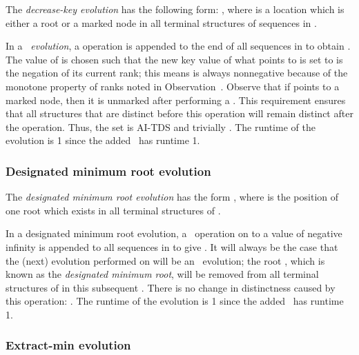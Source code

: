 The \emph{decrease-key evolution} has the following form: , where  is a location which is either a root or a marked node in all terminal structures of sequences in . 
\begin{fullonly}

\end{fullonly}
In a \emph{\opDc\ evolution}, a \opDc operation is appended to the end of all sequences in   to obtain . 
The value of  is chosen such that the new key value of what  points to is set to is the negation of its current rank; this means  is always nonnegative because of the monotone property of ranks noted in Observation~. 
Observe that if  points to a marked node, then it is unmarked after performing a \eDc. This requirement ensures that all structures that are distinct before this operation will remain distinct after the operation. Thus, the set  is AI-TDS and trivially . The runtime of the evolution is 1 since the added \opDc\ has runtime 1.


\subsubsection{Designated minimum root evolution} 

The \emph{designated minimum root evolution} has the form , where  is the position of one root which exists in all terminal structures of .
\begin{fullonly}

\end{fullonly}
In a designated minimum root evolution, a \opDc\ operation on  to a value of negative infinity is appended to all sequences in  to give . It will always be the case that the (next) evolution performed on  will be an \eEm\ evolution; the root , which is known as the \emph{designated minimum root}, will be removed from all terminal structures of  in this subsequent \eEm. There is no change in distinctness caused by this operation: . The runtime of the evolution is 1 since the added \opDc\ has runtime 1.



\subsubsection{Extract-min evolution} 

